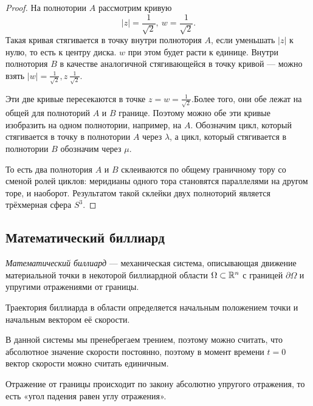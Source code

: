 \begin{proof}
    На полнотории $A$ рассмотрим кривую
    \[|z| = \frac{1}{\sqrt2}, \ w = \frac{1}{\sqrt2}.\]
    Такая кривая стягивается в точку внутри полнотория $A$, если уменьшать $|z|$ к нулю, то есть к центру диска. $w$ при этом будет расти к единице. Внутри полнотория $B$ в качестве аналогичной стягивающейся в точку кривой — можно взять $|w| = \frac{1}{\sqrt2}, z \ \frac{1}{\sqrt2}$.

    Эти две кривые пересекаются в точке $z = w = \frac{1}{\sqrt2}$.Более того, они обе лежат на общей для полноторий $A$ и $B$ границе. Поэтому можно обе эти кривые изобразить на одном полнотории, например, на $A$. Обозначим цикл, который стягивается в точку в полнотории $A$ через $\lambda$, а цикл, который стягивается в полнотории $B$ обозначим через $\mu$.

    То есть два полнотория $A$ и $B$ склеиваются по общему граничному тору со сменой ролей циклов: меридианы одного тора становятся параллелями на другом торе, и наоборот. Результатом такой склейки двух полноторий является трёхмерная сфера $S^3$.
\end{proof} 


\subsection{Математический биллиард}
\begin{definition}
    \textit{Математический биллиард} — механическая система, описывающая движение материальной точки в некоторой биллиардной области $\Omega \subset \mathbb{R}^n$ с границей $\partial \Omega$ и упругими отражениями от границы.
\end{definition} 

\begin{remark}
    Траектория биллиарда в области определяется начальным положением точки и начальным вектором её скорости.
\end{remark}

\begin{remark}
    В данной системы мы пренебрегаем трением, поэтому можно считать, что абсолютное значение скорости постоянно, поэтому в момент времени $t=0$ вектор скорости можно считать единичным.
\end{remark}

\begin{remark}
    Отражение от границы происходит по закону абсолютно упругого отражения, то есть «угол падения равен углу отражения».
\end{remark}

